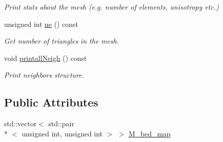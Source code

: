 \begin{DoxyCompactItemize}
\begin{DoxyCompactList}\small\item\em Print stats about the mesh (e.\-g. number of elements, anisotropy etc.) \end{DoxyCompactList}\item 
unsigned int \hyperlink{classTspeed_1_1Mesh_ac5b8a388b633ac0d280f89f56f2b15c5}{ne} () const 
\begin{DoxyCompactList}\small\item\em Get number of triangles in the mesh. \end{DoxyCompactList}\item 
void \hyperlink{classTspeed_1_1Mesh_a7ea0757951214e8dc3a68e9a60a1c17c}{printall\-Neigh} () const 
\begin{DoxyCompactList}\small\item\em Print neighbors structure. \end{DoxyCompactList}\end{DoxyCompactItemize}
\subsection*{Public Attributes}
\begin{DoxyCompactItemize}
\item 
std\-::vector$<$ std\-::pair\\*
$<$ unsigned int, unsigned int $>$ $>$ \hyperlink{classTspeed_1_1Mesh_a8cb823f02d7c75e48bf714b367b25b7d}{M\-\_\-bed\-\_\-map}
\end{DoxyCompactItemize}


